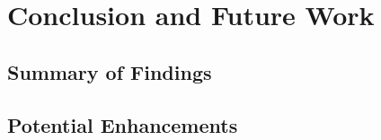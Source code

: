 \documentclass{article}
\begin{document}
\section{Conclusion and Future Work}

\subsection{Summary of Findings}

\subsection{Potential Enhancements}

\newpage



\end{document}
